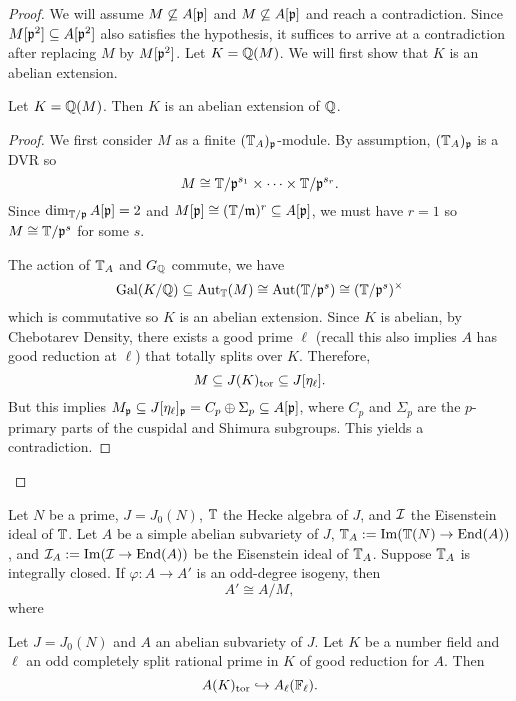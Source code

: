 \documentclass[thesis.tex]{subfiles}
\begin{document}
\begin{proof}
    We will assume $M\not\subseteq A[\mathfrak{p}]$ and $M\not\subseteq A[\mathfrak{p}]$ and reach
    a contradiction. Since $M[\mathfrak{p}^2]\subseteq A[\mathfrak{p}^2]$ also satisfies the
    hypothesis, it suffices to arrive at a contradiction after replacing $M$ by
    $M[\mathfrak{p}^2]$. Let $K = \mathbb{Q}(M)$. We will first show that $K$ is an abelian
    extension.
    \begin{lemma}
        Let $K=\mathbb{Q}(M)$. Then $K$ is an abelian extension of $\mathbb{Q}$.
    \end{lemma}
    \begin{proof}
        We first consider $M$ as a finite $(\mathbb{T}_A)_{\mathfrak{p}}$-module. By assumption,
        $(\mathbb{T}_A)_{\mathfrak{p}}$ is a DVR so
        \[
            M \cong \mathbb{T}/\mathfrak{p}^{s_1}\times \cdots\times \mathbb{T}/\mathfrak{p}^{s_r}.
        \]
        Since $\dim_{\mathbb{T}/\mathfrak{p}} A[\mathfrak{p}] = 2$ and $M[\mathfrak{p}]\cong (\mathbb{T}/\mathfrak{m})^r\subseteq
        A[\mathfrak{p}]$, we must have $r=1$ so $M\cong \mathbb{T}/\mathfrak{p}^s$ for some $s$.

        The action of $\mathbb{T}_A$ and $G_{\mathbb{Q}}$ commute, we have
        \[
            \operatorname{Gal}(K/\mathbb{Q})\subseteq \operatorname{Aut}_{\mathbb{T}}(M)\cong \operatorname{Aut}(\mathbb{T}/\mathfrak{p}^s) \cong
            (\mathbb{T}/\mathfrak{p}^s)^\times
        \]
        which is commutative so $K$ is an abelian extension. Since $K$ is
        abelian, by Chebotarev Density, there exists a good prime $\ell$
        (recall this also implies $A$ has good reduction at $\ell$) that
        totally splits over $K$. Therefore,
        \[
            M \subseteq J(K)_{\mathrm{tor}} \subseteq J[\eta_\ell].
        \]
        But this implies $M_{\mathfrak{p}}\subseteq J[\eta_\ell]_{\mathfrak{p}} = C_p \oplus
        \Sigma_p\subseteq A[\mathfrak{p}]$, where $C_p$ and $\Sigma_p$ are the
        $p$-primary parts of the cuspidal and Shimura subgroups. This yields
        a contradiction.
    \end{proof}
\end{proof}

\begin{theorem}[F. Calegari]
    Let $N$ be a prime, $J=J_0(N)$, $\mathbb{T}$ the Hecke algebra of $J$, and $\mathcal{I}$
    the Eisenstein ideal of $\mathbb{T}$. Let $A$ be a simple abelian subvariety of
    $J$, $\mathbb{T}_A := \operatorname{Im} (\mathbb{T}(N)\to \operatorname{End}(A))$, and $\mathcal{I}_A := \operatorname{Im} (\mathcal{I}\to \operatorname{End}(A))$
    be the Eisenstein ideal of $\mathbb{T}_A$. Suppose $\mathbb{T}_A$ is integrally closed.
    If $\varphi:A\to A'$ is an odd-degree isogeny, then
    \[
        A' \cong A/M,
    \]
    where 
\end{theorem}

\begin{lemma}
    Let $J = J_0(N)$ and $A$ an abelian subvariety of $J$. Let $K$ be a number
    field and $\ell$ an odd completely split rational prime in $K$ of good
    reduction for $A$. Then
    \[
        A(K)_{\mathrm{tor}} \hookrightarrow A_\ell(\mathbb{F}_\ell).
    \]
\end{lemma}
\end{document}

